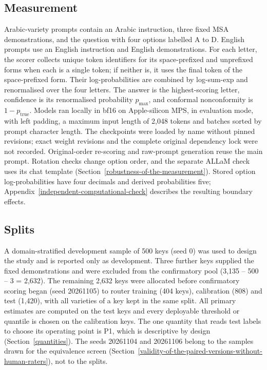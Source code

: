 \documentclass[applsci,article,submit,pdftex,oneauthor]{Definitions/mdpi}
\begin{document}
\hypertarget{measurement}{%
\subsection{Measurement}\label{measurement}}

Arabic-variety prompts contain an Arabic instruction, three fixed MSA demonstrations, and the question with four options labelled A to D. English prompts use an English instruction and English demonstrations. For each letter, the scorer collects unique token identifiers for its space-prefixed and unprefixed forms when each is a single token; if neither is, it uses the final token of the space-prefixed form. Their log-probabilities are combined by log-sum-exp and renormalised over the four letters. The answer is the highest-scoring letter, confidence is its renormalised probability $p_{\max}$, and conformal nonconformity is $1-p_{\mathrm{true}}$. Models ran locally in bf16 on Apple-silicon MPS, in evaluation mode, with left padding, a maximum input length of 2,048 tokens and batches sorted by prompt character length. The checkpoints were loaded by name without pinned revisions; exact weight revisions and the complete original dependency lock were not recorded. Original-order re-scoring and raw-prompt generation reuse the main prompt. Rotation checks change option order, and the separate ALLaM check uses its chat template (Section~\ref{robustness-of-the-measurement}). Stored option log-probabilities have four decimals and derived probabilities five; Appendix~\ref{independent-computational-check} describes the resulting boundary effects.

\hypertarget{splits}{%
\subsection{Splits}\label{splits}}

A domain-stratified development sample of 500 keys (seed 0) was used to design the study and is reported only as development. Three further keys supplied the fixed demonstrations and were excluded from the confirmatory pool (3,135 -- 500 -- 3 = 2,632). The remaining 2,632 keys were allocated before confirmatory scoring began (seed 20261105) to router training (404 keys), calibration (808) and test (1,420), with all varieties of a key kept in the same split. All primary estimates are computed on the test keys and every deployable threshold or quantile is chosen on the calibration keys. The one quantity that reads test labels to choose its operating point is P1, which is descriptive by design (Section~\ref{quantities}). The seeds 20261104 and 20261106 belong to the samples drawn for the equivalence screen (Section~\ref{validity-of-the-paired-versions-without-human-raters}), not to the splits.
\end{document}
